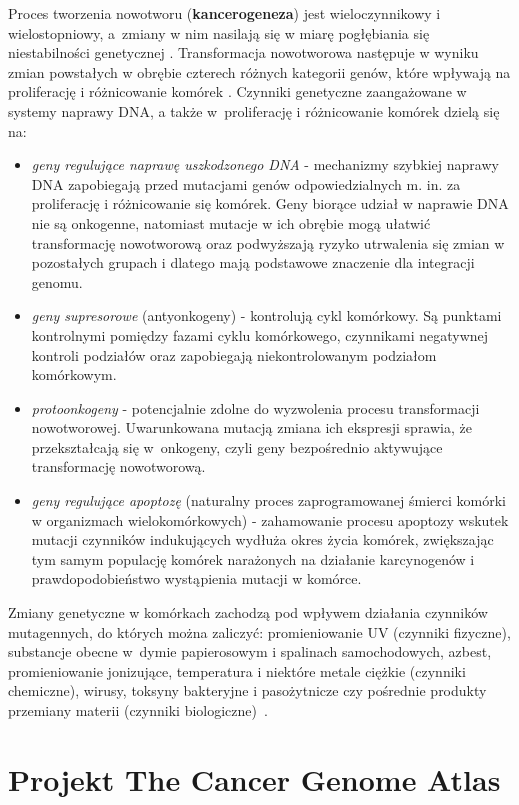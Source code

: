 Proces tworzenia nowotworu (\textbf{kancerogeneza}) jest wieloczynnikowy i wielostopniowy, a~zmiany w nim nasilają się w miarę pogłębiania się niestabilności genetycznej \citep{zikula2}. Transformacja nowotworowa następuje w wyniku zmian powstałych w obrębie czterech różnych kategorii genów, które wpływają na proliferację i różnicowanie komórek \citep{zikula}. Czynniki genetyczne zaangażowane w systemy naprawy DNA, a także w~proliferację i różnicowanie komórek \citep{zikula4} dzielą się na:  
\begin{itemize}
\item \textit{geny regulujące naprawę uszkodzonego DNA} - mechanizmy szybkiej naprawy DNA zapobiegają przed mutacjami genów odpowiedzialnych m. in. za proliferację i różnicowanie się komórek. Geny biorące udział w naprawie DNA nie są onkogenne, natomiast mutacje w ich obrębie mogą ułatwić transformację nowotworową oraz podwyższają ryzyko utrwalenia się zmian w pozostałych grupach i dlatego mają podstawowe znaczenie dla integracji genomu.
\item \textit{geny supresorowe} (antyonkogeny) - kontrolują cykl komórkowy. Są punktami kontrolnymi pomiędzy fazami cyklu komórkowego, czynnikami negatywnej kontroli podziałów oraz zapobiegają niekontrolowanym podziałom komórkowym.
\item \textit{protoonkogeny} - potencjalnie zdolne do wyzwolenia procesu transformacji nowotworowej. Uwarunkowana mutacją zmiana ich ekspresji sprawia, że przekształcają się w~onkogeny, czyli geny bezpośrednio aktywujące transformację nowotworową.
\item \textit{geny regulujące apoptozę} (naturalny proces zaprogramowanej śmierci komórki w organizmach wielokomórkowych) - zahamowanie procesu apoptozy wskutek mutacji czynników indukujących wydłuża okres życia komórek, zwiększając tym samym populację komórek narażonych na działanie karcynogenów i prawdopodobieństwo wystąpienia mutacji w komórce.
\end{itemize}
Zmiany genetyczne w komórkach zachodzą pod wpływem działania czynników mutagennych, do których można zaliczyć: promieniowanie UV (czynniki fizyczne), substancje obecne w~dymie papierosowym i spalinach samochodowych, azbest, promieniowanie jonizujące, temperatura i niektóre metale ciężkie (czynniki chemiczne), wirusy, toksyny bakteryjne i pasożytnicze czy pośrednie produkty przemiany materii (czynniki biologiczne)~\citep{zikula3}.


\section{Projekt The Cancer Genome Atlas}\label{chan:TCGA}

